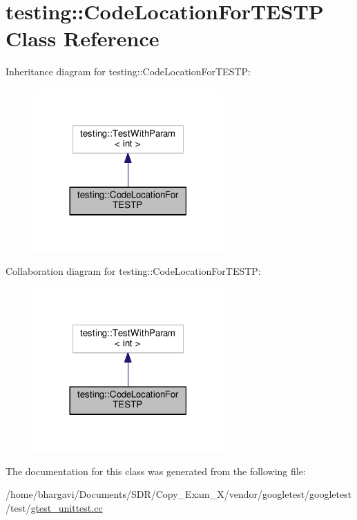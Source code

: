 \hypertarget{classtesting_1_1_code_location_for_t_e_s_t_p}{}\section{testing\+:\+:Code\+Location\+For\+T\+E\+S\+TP Class Reference}
\label{classtesting_1_1_code_location_for_t_e_s_t_p}


Inheritance diagram for testing\+:\+:Code\+Location\+For\+T\+E\+S\+TP\+:
\nopagebreak
\begin{figure}[H]
\begin{center}
\leavevmode
\includegraphics[width=206pt]{classtesting_1_1_code_location_for_t_e_s_t_p__inherit__graph}
\end{center}
\end{figure}


Collaboration diagram for testing\+:\+:Code\+Location\+For\+T\+E\+S\+TP\+:
\nopagebreak
\begin{figure}[H]
\begin{center}
\leavevmode
\includegraphics[width=206pt]{classtesting_1_1_code_location_for_t_e_s_t_p__coll__graph}
\end{center}
\end{figure}


The documentation for this class was generated from the following file\+:\begin{DoxyCompactItemize}
\item 
/home/bhargavi/\+Documents/\+S\+D\+R/\+Copy\+\_\+\+Exam\+\_\+X/vendor/googletest/googletest/test/\hyperlink{gtest__unittest_8cc}{gtest\+\_\+unittest.\+cc}\end{DoxyCompactItemize}
